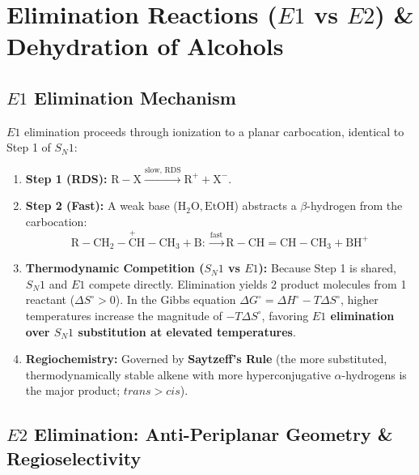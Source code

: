 \documentclass[10pt,a4paper]{article}
\begin{document}
\newpage
\section{Elimination Reactions (\texorpdfstring{$E1$}{E1} vs \texorpdfstring{$E2$}{E2}) \& Dehydration of Alcohols}

\subsection{\texorpdfstring{$E1$}{E1} Elimination Mechanism}

\begin{conceptbox}
$E1$ elimination proceeds through ionization to a planar carbocation, identical to Step 1 of $S_N1$:
\begin{enumerate}[leftmargin=*]
  \item \textbf{Step 1 (RDS):} $\mathrm{R-X} \xrightarrow{\text{slow, RDS}} \mathrm{R}^+ + \mathrm{X}^-$.
  \item \textbf{Step 2 (Fast):} A weak base ($\mathrm{H_2O, EtOH}$) abstracts a $\beta$-hydrogen from the carbocation:
  \begin{equation}
    \mathrm{R-CH_2-\overset{+}{C}H-CH_3} + \mathrm{B:} \xrightarrow{\text{fast}} \mathrm{R-CH=CH-CH_3} + \mathrm{BH}^+
  \end{equation}
  \item \textbf{Thermodynamic Competition ($S_N1$ vs $E1$):} Because Step 1 is shared, $S_N1$ and $E1$ compete directly. Elimination yields 2 product molecules from 1 reactant ($\Delta S^\circ > 0$). In the Gibbs equation $\Delta G^\circ = \Delta H^\circ - T\Delta S^\circ$, higher temperatures increase the magnitude of $-T\Delta S^\circ$, favoring \textbf{$E1$ elimination over $S_N1$ substitution at elevated temperatures}.
  \item \textbf{Regiochemistry:} Governed by \textbf{Saytzeff's Rule} (the more substituted, thermodynamically stable alkene with more hyperconjugative $\alpha$-hydrogens is the major product; $trans > cis$).
\end{enumerate}
\end{conceptbox}

\subsection{\texorpdfstring{$E2$}{E2} Elimination: Anti-Periplanar Geometry \& Regioselectivity}
\end{document}
